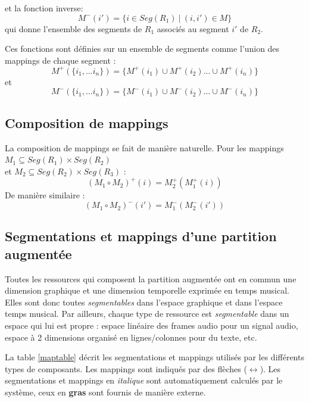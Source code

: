 \documentclass{article}
\newcommand{\seg}[1]			{Seg(#1)}
\newcommand{\lra}				{$\leftrightarrow$}
\begin{document}
et la fonction inverse:
\begin{equation}
	M^{-}(i')=\{ i \in \seg{R_{1}}\ |\ (i,i') \in M\}
\end{equation}
qui donne l'ensemble des segments de $R_{1}$ associés au segment $i'$ de $R_{2}$.

Ces fonctions sont définies sur un ensemble de segments comme l'union des mappings de chaque segment :
\begin{equation}
	M^{+}(\{i_1, ...i_n\}) = \{ M^{+}(i_1) \cup M^{+}(i_2) ...  \cup M^{+}(i_n) \}
\end{equation}
et
\begin{equation}
	M^{-}(\{i_1, ...i_n\})=\{ M^{-}(i_1) \cup M^{-}(i_2) ...  \cup M^{-}(i_n) \}
\end{equation}


\subsection{Composition de mappings}\label{subsec:compmap}
La composition de mappings se fait de manière naturelle.
Pour les mappings $M_{1}\subseteq \seg{R_{1}}\times \seg{R_{2}}$ \\
et $M_{2}\subseteq \seg{R_{2}}\times \seg{R_{3}}$ :
\begin{equation}
(M_{1} \circ M_{2})^{+}(i) = M_2^{+}(M_1^{+}(i))
\end{equation}
De manière similaire :
\begin{equation}
(M_{1} \circ M_{2})^{-}(i') = M_1^{-}(M_2^{-}(i'))
\end{equation}


\subsection{Segmentations et mappings d'une partition augmentée}
Toutes les ressources qui composent la partition augmentée ont en commun une dimension graphique et une dimension temporelle exprimée en temps musical. Elles sont donc toutes \emph{segmentables} dans l'espace graphique et dans l'espace temps musical. Par ailleurs, chaque type de ressource est \emph{segmentable} dans un espace qui lui est propre : espace linéaire des frames audio pour un signal audio, espace à 2 dimensions organisé en lignes/colonnes pour du texte, etc. 

La table \ref{maptable} décrit les segmentations et mappings utilisés par les différents types de composants. Les mappings sont indiqués par des flèches (\lra). Les segmentations et mappings en \textit{italique} sont automatiquement calculés par le système, ceux en \textbf{gras} sont fournis de manière externe.
\end{document}
